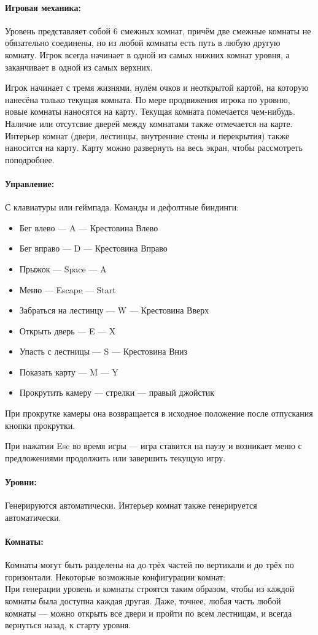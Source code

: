 \documentclass[12pt,a4paper]{article}
\begin{document}
\paragraph{Игровая механика:}
Уровень представляет собой 6 смежных комнат, причём две смежные комнаты не обязательно соединены, но из любой комнаты есть путь в любую другую комнату. Игрок всегда начинает в одной из самых нижних комнат уровня, а заканчивает в одной из самых верхних.

Игрок начинает с тремя жизнями, нулём очков и неоткрытой картой, на которую нанесёна только текущая комната. По мере продвижения игрока по уровню, новые комнаты наносятся на карту. Текущая комната помечается чем-нибудь. Наличие или отсутсвие дверей между комнатами также отмечается на карте. Интерьер комнат (двери, лестинцы, внутренние стены и перекрытия) также наносится на карту. Карту можно развернуть на весь экран, чтобы рассмотреть поподробнее.
\paragraph{Управление:}
С клавиатуры или геймпада.
Команды и дефолтные биндинги:
\begin{itemize}
\item Бег влево --- A --- Крестовина Влево
\item Бег вправо --- D --- Крестовина Вправо
\item Прыжок --- Space --- A
\item Меню --- Escape --- Start
\item Забраться на лестинцу --- W --- Крестовина Вверх
\item Открыть дверь --- E --- X
\item Упасть с лестницы --- S --- Крестовина Вниз
\item Показать карту --- M --- Y
\item Прокрутить камеру --- стрелки --- правый джойстик
\end{itemize}
При прокрутке камеры она возвращается в исходное положение после отпускания кнопки прокрутки.

При нажатии Esc во время игры --- игра ставится на паузу и возникает меню с предложениями продолжить или завершить текущую игру.
\paragraph{Уровни:}
Генерируются автоматически. Интерьер комнат также генерируется автоматически.
\paragraph{Комнаты:}
Комнаты могут быть разделены на до трёх частей по вертикали и до трёх по горизонтали. Некоторые возможные конфигурации комнат:\\
\noindent {}
\noindent {}
При генерации уровень и комнаты строятся таким образом, чтобы из каждой комнаты была доступна каждая другая. Даже, точнее, любая часть любой комнаты --- можно открыть все двери и пройти по всем лестницам, и всегда вернуться назад, к старту уровня.
\end{document}
